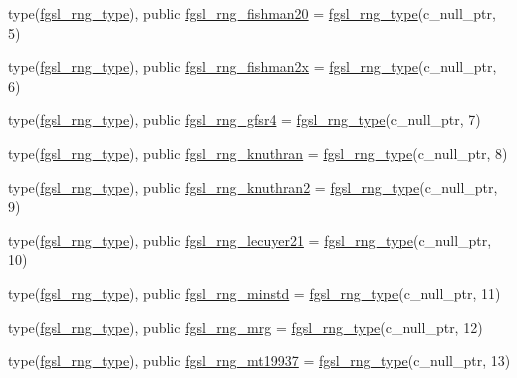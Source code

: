 \begin{DoxyCompactItemize}
\item 
type(\hyperlink{structfgsl_1_1fgsl__rng__type}{fgsl\-\_\-rng\-\_\-type}), public \hyperlink{classfgsl_aaa1400ecb0b7757a72553cd766ac5880}{fgsl\-\_\-rng\-\_\-fishman20} = \hyperlink{structfgsl_1_1fgsl__rng__type}{fgsl\-\_\-rng\-\_\-type}(c\-\_\-null\-\_\-ptr, 5)
\item 
type(\hyperlink{structfgsl_1_1fgsl__rng__type}{fgsl\-\_\-rng\-\_\-type}), public \hyperlink{classfgsl_a6564b2d833a35c41a82dc834f2cc3263}{fgsl\-\_\-rng\-\_\-fishman2x} = \hyperlink{structfgsl_1_1fgsl__rng__type}{fgsl\-\_\-rng\-\_\-type}(c\-\_\-null\-\_\-ptr, 6)
\item 
type(\hyperlink{structfgsl_1_1fgsl__rng__type}{fgsl\-\_\-rng\-\_\-type}), public \hyperlink{classfgsl_a12158a5916e899c6bf9c9ceee7352105}{fgsl\-\_\-rng\-\_\-gfsr4} = \hyperlink{structfgsl_1_1fgsl__rng__type}{fgsl\-\_\-rng\-\_\-type}(c\-\_\-null\-\_\-ptr, 7)
\item 
type(\hyperlink{structfgsl_1_1fgsl__rng__type}{fgsl\-\_\-rng\-\_\-type}), public \hyperlink{classfgsl_af73840b5889e5a54be83e7596d5973c0}{fgsl\-\_\-rng\-\_\-knuthran} = \hyperlink{structfgsl_1_1fgsl__rng__type}{fgsl\-\_\-rng\-\_\-type}(c\-\_\-null\-\_\-ptr, 8)
\item 
type(\hyperlink{structfgsl_1_1fgsl__rng__type}{fgsl\-\_\-rng\-\_\-type}), public \hyperlink{classfgsl_a528795b3607aafcfc90f8615237804fa}{fgsl\-\_\-rng\-\_\-knuthran2} = \hyperlink{structfgsl_1_1fgsl__rng__type}{fgsl\-\_\-rng\-\_\-type}(c\-\_\-null\-\_\-ptr, 9)
\item 
type(\hyperlink{structfgsl_1_1fgsl__rng__type}{fgsl\-\_\-rng\-\_\-type}), public \hyperlink{classfgsl_a636f91cce473d59c5b32c77a329f4486}{fgsl\-\_\-rng\-\_\-lecuyer21} = \hyperlink{structfgsl_1_1fgsl__rng__type}{fgsl\-\_\-rng\-\_\-type}(c\-\_\-null\-\_\-ptr, 10)
\item 
type(\hyperlink{structfgsl_1_1fgsl__rng__type}{fgsl\-\_\-rng\-\_\-type}), public \hyperlink{classfgsl_a9bc7cd5586595c2ac502e3f6496869a9}{fgsl\-\_\-rng\-\_\-minstd} = \hyperlink{structfgsl_1_1fgsl__rng__type}{fgsl\-\_\-rng\-\_\-type}(c\-\_\-null\-\_\-ptr, 11)
\item 
type(\hyperlink{structfgsl_1_1fgsl__rng__type}{fgsl\-\_\-rng\-\_\-type}), public \hyperlink{classfgsl_a598ecc30ecba7ed571bf0d76f66cc23f}{fgsl\-\_\-rng\-\_\-mrg} = \hyperlink{structfgsl_1_1fgsl__rng__type}{fgsl\-\_\-rng\-\_\-type}(c\-\_\-null\-\_\-ptr, 12)
\item 
type(\hyperlink{structfgsl_1_1fgsl__rng__type}{fgsl\-\_\-rng\-\_\-type}), public \hyperlink{classfgsl_ac85f5a9aab93968683416a0bf672122d}{fgsl\-\_\-rng\-\_\-mt19937} = \hyperlink{structfgsl_1_1fgsl__rng__type}{fgsl\-\_\-rng\-\_\-type}(c\-\_\-null\-\_\-ptr, 13)

\end{DoxyCompactItemize}
